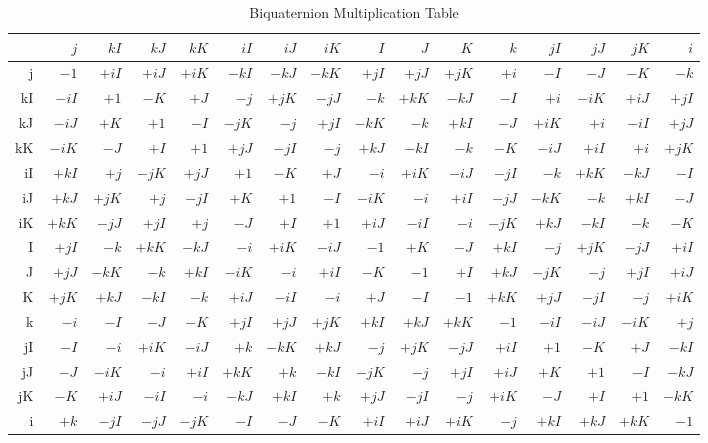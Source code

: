 \documentclass[a4paper]{article}
\begin{document}
\begin{table}[ht]
  \begin{center}
    \caption{Biquaternion Multiplication Table}
    \small
    \begin{tabular}{r|rrrrrrrrrrrrrrr}
      &$j$&$kI$&$kJ$&$kK$&$iI$&$iJ$&$iK$&$I$&$J$&$K$&$k$&$jI$&$jJ$&$jK$&$i$ \\ \hline
      j&$-1$&$+iI$&$+iJ$&$+iK$&$-kI$&$-kJ$&$-kK$&$+jI$&$+jJ$&$+jK$&$+i$&$-I$&$-J$&$-K$&$-k$ \\ \hline
      kI&$-iI$&$+1$&$-K$&$+J$&$-j$&$+jK$&$-jJ$&$-k$&$+kK$&$-kJ$&$-I$&$+i$&$-iK$&$+iJ$&$+jI$ \\ \hline
      kJ&$-iJ$&$+K$&$+1$&$-I$&$-jK$&$-j$&$+jI$&$-kK$&$-k$&$+kI$&$-J$&$+iK$&$+i$&$-iI$&$+jJ$ \\ \hline
      kK&$-iK$&$-J$&$+I$&$+1$&$+jJ$&$-jI$&$-j$&$+kJ$&$-kI$&$-k$&$-K$&$-iJ$&$+iI$&$+i$&$+jK$ \\ \hline
      iI&$+kI$&$+j$&$-jK$&$+jJ$&$+1$&$-K$&$+J$&$-i$&$+iK$&$-iJ$&$-jI$&$-k$&$+kK$&$-kJ$&$-I$ \\ \hline
      iJ&$+kJ$&$+jK$&$+j$&$-jI$&$+K$&$+1$&$-I$&$-iK$&$-i$&$+iI$&$-jJ$&$-kK$&$-k$&$+kI$&$-J$ \\ \hline
      iK&$+kK$&$-jJ$&$+jI$&$+j$&$-J$&$+I$&$+1$&$+iJ$&$-iI$&$-i$&$-jK$&$+kJ$&$-kI$&$-k$&$-K$ \\ \hline
      I&$+jI$&$-k$&$+kK$&$-kJ$&$-i$&$+iK$&$-iJ$&$-1$&$+K$&$-J$&$+kI$&$-j$&$+jK$&$-jJ$&$+iI$ \\ \hline
      J&$+jJ$&$-kK$&$-k$&$+kI$&$-iK$&$-i$&$+iI$&$-K$&$-1$&$+I$&$+kJ$&$-jK$&$-j$&$+jI$&$+iJ$ \\ \hline
      K&$+jK$&$+kJ$&$-kI$&$-k$&$+iJ$&$-iI$&$-i$&$+J$&$-I$&$-1$&$+kK$&$+jJ$&$-jI$&$-j$&$+iK$ \\ \hline
      k&$-i$&$-I$&$-J$&$-K$&$+jI$&$+jJ$&$+jK$&$+kI$&$+kJ$&$+kK$&$-1$&$-iI$&$-iJ$&$-iK$&$+j$ \\ \hline
      jI&$-I$&$-i$&$+iK$&$-iJ$&$+k$&$-kK$&$+kJ$&$-j$&$+jK$&$-jJ$&$+iI$&$+1$&$-K$&$+J$&$-kI$ \\ \hline
      jJ&$-J$&$-iK$&$-i$&$+iI$&$+kK$&$+k$&$-kI$&$-jK$&$-j$&$+jI$&$+iJ$&$+K$&$+1$&$-I$&$-kJ$ \\ \hline
      jK&$-K$&$+iJ$&$-iI$&$-i$&$-kJ$&$+kI$&$+k$&$+jJ$&$-jI$&$-j$&$+iK$&$-J$&$+I$&$+1$&$-kK$ \\ \hline
      i&$+k$&$-jI$&$-jJ$&$-jK$&$-I$&$-J$&$-K$&$+iI$&$+iJ$&$+iK$&$-j$&$+kI$&$+kJ$&$+kK$&$-1$ \\ \hline
    \end{tabular}
  \end{center}
\end{table}
\end{document}
